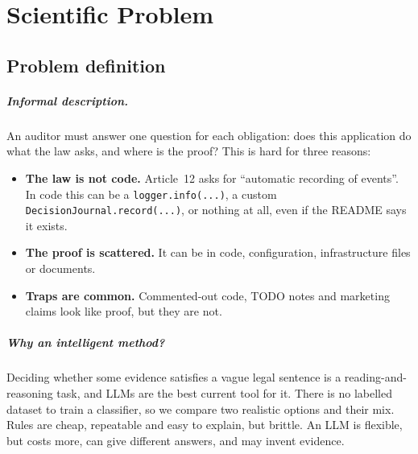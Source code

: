\chapter{Scientific Problem}
\label{chapter:problem}

\section{Problem definition}
\label{section:problemDefinition}

\paragraph{Informal description.} An auditor must answer one question for each obligation: does this application do
what the law asks, and where is the proof? This is hard for three reasons:
\begin{itemize}[leftmargin=*]
  \item \textbf{The law is not code.} Article~12 asks for ``automatic recording of events''. In code this can be a
        \texttt{logger.info(...)}, a custom \texttt{DecisionJournal.record(...)}, or nothing at all, even if the README
        says it exists.
  \item \textbf{The proof is scattered.} It can be in code, configuration, infrastructure files or documents.
  \item \textbf{Traps are common.} Commented-out code, TODO notes and marketing claims look like proof, but they are not.
\end{itemize}

\paragraph{Why an intelligent method?} Deciding whether some evidence satisfies a vague legal sentence is a
reading-and-reasoning task, and LLMs are the best current tool for it. There is no labelled dataset to train a
classifier, so we compare two realistic options and their mix. Rules are cheap, repeatable and easy to explain, but
brittle. An LLM is flexible, but costs more, can give different answers, and may invent evidence.

